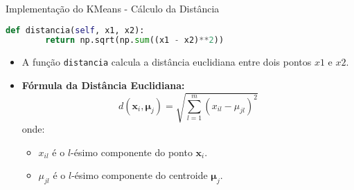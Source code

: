 \documentclass{beamer}
\begin{document}
\begin{frame}[fragile]{Implementação do KMeans - Cálculo da Distância}
\begin{lstlisting}[language=Python]
    def distancia(self, x1, x2):
        return np.sqrt(np.sum((x1 - x2)**2))
\end{lstlisting}
    \vspace{0.3cm}
    \begin{itemize}
        \item A função \texttt{distancia} calcula a distância euclidiana entre dois pontos \( x1 \) e \( x2 \).
    \end{itemize}
    \vspace{0.3cm}
    \begin{itemize}
        \item \textbf{Fórmula da Distância Euclidiana:}
        \[
        d(\mathbf{x}_i, \mathbf{\mu}_j) = \sqrt{\sum_{l=1}^{m} (x_{il} - \mu_{jl})^2}
        \]
        onde:
        \begin{itemize}
            \item \( x_{il} \) é o \( l \)-ésimo componente do ponto \( \mathbf{x}_i \).
            \item \( \mu_{jl} \) é o \( l \)-ésimo componente do centroide \( \mathbf{\mu}_j \).
        \end{itemize}
    \end{itemize}
\end{frame}
\end{document}

